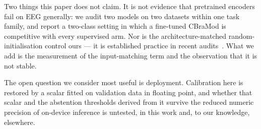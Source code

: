 Two things this paper does not claim. It is not evidence that pretrained
encoders fail on EEG generally: we audit two models on two datasets within one
task family, and report a two-class setting in which a fine-tuned CBraMod is
competitive with every supervised arm. Nor is the architecture-matched
random-initialisation control ours --- it is established practice in recent
audits~\cite{kontras2026neuroatlas,banville2026neuralbench,zare2026negativecontrol}.
What we add is the measurement of the input-matching term and the observation
that it is not stable.

The open question we consider most useful is deployment. Calibration here is
restored by a scalar fitted on validation data in floating point, and whether
that scalar and the abstention thresholds derived from it survive the reduced
numeric precision of on-device inference is untested, in this work and, to our
knowledge, elsewhere.
